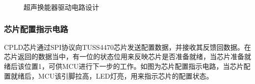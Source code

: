 \begin{figure}[ht]
	\centering
	\caption{超声换能器驱动电路设计}
	\label{超声换能器驱动电路设计}
\end{figure}
\subsubsection{芯片配置指示电路}
CPLD芯片通过SPI协议向TUSS4470芯片发送配置数据，并接收其反馈回数据。在芯片返回的数据当中，有一位的状态位用来反映芯片是否准备就绪，当芯片准备就绪后该位置1，可供MCU进行下一步的工作。如图为芯片配置指示电路，当芯片配置就绪后，MCU该引脚拉高，LED灯亮，用来指示芯片的配置状态。
